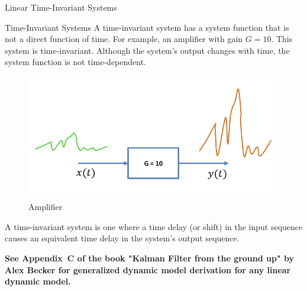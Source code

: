 \begin{frame}{Linear Time-Invariant Systems}
    
\begin{block}{Time-Invariant Systems}
A time-invariant system has a system function that is not a direct function of time. For example, an amplifier with gain \(G = 10\). This system is time-invariant. Although the system’s output changes with time, the system function is not time-dependent.

\begin{figure}
    \centering
    \includegraphics[width=0.6\linewidth]{Figures//Chapter2/Amplifier.png}
    \caption{Amplifier}
    \vspace{-10pt}
    \label{fig:amplifier}
\end{figure}

A time-invariant system is one where a time delay (or shift) in the input sequence causes an equivalent time delay in the system’s output sequence.
\end{block}

\textbf{See Appendix~C of the book "Kalman Filter from the ground up" by Alex Becker for generalized dynamic model derivation for any linear dynamic model.}

\end{frame}


